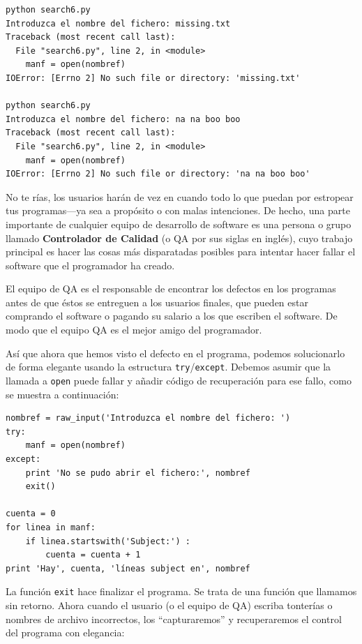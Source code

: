 \beforeverb
\begin{verbatim}
python search6.py 
Introduzca el nombre del fichero: missing.txt
Traceback (most recent call last):
  File "search6.py", line 2, in <module>
    manf = open(nombref)
IOError: [Errno 2] No such file or directory: 'missing.txt'

python search6.py 
Introduzca el nombre del fichero: na na boo boo
Traceback (most recent call last):
  File "search6.py", line 2, in <module>
    manf = open(nombref)
IOError: [Errno 2] No such file or directory: 'na na boo boo'
\end{verbatim}
\afterverb
%
No te rías, los usuarios harán de vez en cuando todo lo que puedan por estropear
tus programas---ya sea a propósito o con malas intenciones.
De hecho, una parte importante de cualquier equipo de desarrollo de software
es una persona o grupo llamado {\bf Controlador de Calidad}
(o QA por sus siglas en inglés), cuyo trabajo principal es hacer las cosas más disparatadas
posibles para intentar hacer fallar el software que el programador ha creado.

El equipo de QA es el responsable de encontrar los defectos en los programas antes
de que éstos se entreguen a los usuarios finales, que pueden estar comprando el
software o pagando su salario a los que escriben el software. De modo que el equipo QA
es el mejor amigo del programador.

Así que ahora que hemos visto el defecto en el programa, podemos solucionarlo
de forma elegante usando la estructura {\tt try}/{\tt except}. Debemos asumir que la llamada
a {\tt open} puede fallar y añadir código de recuperación para ese fallo,
como se muestra a continuación:

\beforeverb
\begin{verbatim}
nombref = raw_input('Introduzca el nombre del fichero: ')
try:
    manf = open(nombref)
except:
    print 'No se pudo abrir el fichero:', nombref
    exit()

cuenta = 0
for linea in manf:
    if linea.startswith('Subject:') : 
        cuenta = cuenta + 1
print 'Hay', cuenta, 'líneas subject en', nombref
\end{verbatim}
\afterverb
%
La función {\tt exit} hace finalizar el programa. Se trata de una función
que llamamos sin retorno. Ahora cuando el usuario (o
el equipo de QA) escriba tonterías o nombres de archivo incorrectos,
los ``capturaremos'' y recuperaremos el control del programa con elegancia:

